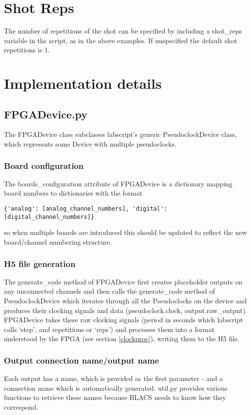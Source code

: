 \documentclass[11pt,a4paper]{article}
\begin{document}
\section{Shot Reps}
The number of repetitions of the shot can be specified by including a shot\_reps variable in the script, as in the above examples. If unspecified the default shot repetitions is 1.

\section{Implementation details}

\subsection{FPGADevice.py}
The FPGADevice class subclasses labscript's generic PseudoclockDevice class, which represents some Device with multiple pseudoclocks. 

\subsubsection{Board configuration}
The boards\_configuration attribute of FPGADevice is a dictionary mapping board numbers to dictionaries with the format

\begin{verbatim}
{'analog': [analog_channel_numbers], 'digital': [digital_channel_numbers]}
\end{verbatim}

so when multiple boards are introduced this should be updated to reflect the new board/channel numbering structure.

\subsubsection{H5 file generation}
The generate\_code method of FPGADevice first creates placeholder outputs on any unconnected channels and then calls the generate\_code method of PseudoclockDevice which iterates through all the Pseudoclocks on the device and produces their clocking signals and data (pseudoclock.clock, output.raw\_output). FPGADevice takes these raw clocking signals (period in seconds which labscript calls `step', and repetitions or `reps') and processes them into a format understood by the FPGA (see section \ref{clockproc}), writing them to the H5 file.

\subsubsection{Output connection name/output name}
Each output has a name, which is provided as the first parameter - and a connection name which is automatically generated. util.py provides various functions to retrieve these names because BLACS needs to know how they correspond. 
\end{document}
